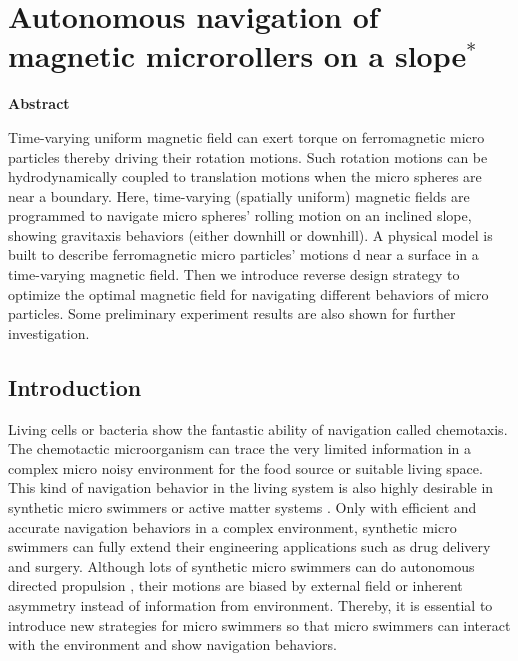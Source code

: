 \chapter{Autonomous navigation of magnetic microrollers on a slope$^{*}$} 
\begin{center}
\vspace*{1\baselineskip}
\textbf{Abstract}
\end{center}
Time-varying uniform magnetic field can exert torque on ferromagnetic micro particles thereby driving their rotation motions. Such rotation motions can be hydrodynamically coupled to translation motions when the micro spheres are near a boundary. Here, time-varying (spatially uniform) magnetic fields are  programmed to navigate micro spheres' rolling motion on an inclined slope, showing gravitaxis behaviors (either downhill or downhill). A physical model is  built  to describe ferromagnetic micro particles' motions d near a surface in a time-varying magnetic field. Then we introduce reverse design strategy to optimize the optimal magnetic field for navigating different behaviors of micro particles. Some preliminary experiment results are also shown for further investigation. 
\section{Introduction}
Living cells or bacteria show the fantastic ability of navigation called chemotaxis\autocite{alon1999robustness,adler1975chemotaxis}. The chemotactic microorganism can trace the very limited information in  a complex micro noisy environment for the food source or suitable living space\autocite{keller1971model}. This kind of navigation behavior in the living system is also highly desirable in synthetic micro swimmers or active matter systems \autocite{patteson2016active}. Only with efficient and accurate navigation behaviors in a complex environment, synthetic micro swimmers can fully extend their engineering applications such as drug delivery and surgery\autocite{de2017micromotor,xu2018sperm}. Although lots of synthetic  micro swimmers can do autonomous directed propulsion \autocite{yan2016reconfiguring,lee2019directed,baker2019shape}, their motions are biased by  external field or inherent asymmetry instead of information from environment. Thereby, it is essential to introduce new strategies for micro swimmers so that micro swimmers can interact with the environment and show navigation behaviors.  


